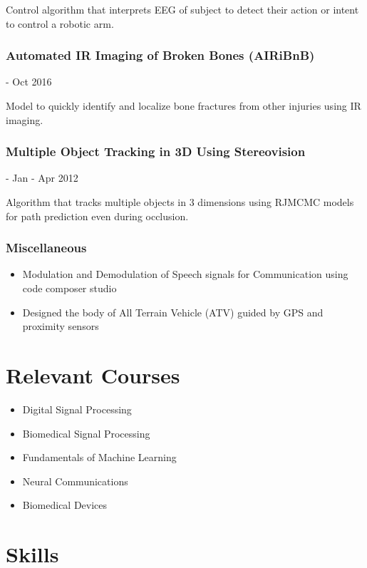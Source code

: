 \documentclass{article}
\begin{document}
Control algorithm that interprets EEG of subject to detect their action or intent to control a robotic arm.

 \subsubsection{Automated IR Imaging of Broken Bones (AIRiBnB)} - Oct 2016
 
Model to quickly identify and localize bone fractures from other injuries using IR imaging.
    
\subsubsection{Multiple Object Tracking in 3D Using Stereovision} - Jan - Apr 2012

Algorithm that tracks multiple objects in 3 dimensions using RJMCMC models for path prediction even during occlusion.
    
\subsubsection{Miscellaneous}
\begin{itemize}
    \item Modulation and Demodulation of Speech signals for Communication using code composer studio 
    \item Designed the body of All Terrain Vehicle (ATV) guided by GPS and proximity sensors  
\end{itemize}


\section{Relevant Courses}
\begin{itemize}
    \item Digital Signal Processing
    \item Biomedical Signal Processing
    \item Fundamentals of Machine Learning
    \item Neural Communications
    \item Biomedical Devices
\end{itemize}

\section{Skills}
\end{document}
